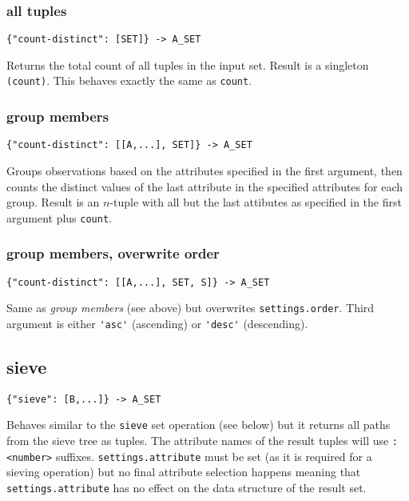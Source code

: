 \documentclass[a4paper]{article}
\begin{document}
\subsubsection{all tuples}

\begin{verbatim}
{"count-distinct": [SET]} -> A_SET
\end{verbatim}

Returns the total count of all tuples in the input set. Result is a
singleton \verb|(count)|. This behaves exactly the same as \verb|count|.

\subsubsection{group members}

\begin{verbatim}
{"count-distinct": [[A,...], SET]} -> A_SET
\end{verbatim}

Groups observations based on the attributes specified in the first
argument, then counts the distinct values of the last attribute in the specified attributes for each group.  Result is an
$n$-tuple with all but the last attibutes as specified in the first argument
plus \verb|count|.

\subsubsection{group members, overwrite order}

\begin{verbatim}
{"count-distinct": [[A,...], SET, S]} -> A_SET
\end{verbatim}

Same as \textit{group members} (see above) but overwrites \verb|settings.order|. Third argument is either \verb|'asc'| (ascending)
or \verb|'desc'| (descending).

\subsection{sieve}

\begin{verbatim}
{"sieve": [B,...]} -> A_SET
\end{verbatim}

Behaves similar to the \verb|sieve| set operation (see below) but it returns all paths from the sieve tree as tuples.
The attribute names of the result tuples will use \verb|:<number>| suffixes. \verb|settings.attribute| must be set (as it is required for a sieving operation)
but no final attribute selection happens meaning that \verb|settings.attribute| has no effect on the data structure of the result set. 
\end{document}
